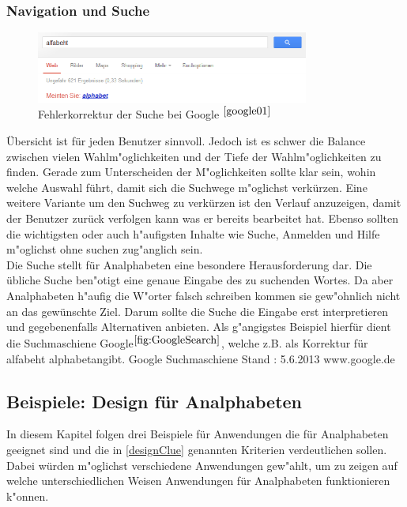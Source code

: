 \subsubsection{Navigation und Suche}
\begin{figure}[h]
	\centering
		\includegraphics[width=0.80\textwidth]{Daten/rechtschreibung.png}
	\caption{Fehlerkorrektur der Suche bei Google $^{\ref{google01}}$}
	\label{fig:GoogleSearch}
\end{figure}

Übersicht ist für jeden Benutzer sinnvoll. Jedoch ist es schwer die Balance zwischen vielen Wahlm"oglichkeiten und der Tiefe der Wahlm"oglichkeiten zu finden. Gerade zum Unterscheiden der M"oglichkeiten sollte klar sein, wohin welche Auswahl führt, damit sich die 
Suchwege m"oglichst verkürzen. Eine weitere Variante um den Suchweg zu verkürzen ist den Verlauf anzuzeigen, damit der Benutzer zurück verfolgen kann was er bereits bearbeitet hat. Ebenso sollten die wichtigsten oder auch h"aufigsten Inhalte wie Suche, Anmelden und Hilfe m"oglichst ohne suchen zug"anglich sein.\\
Die Suche stellt für Analphabeten eine besondere Herausforderung dar. Die übliche Suche ben"otigt eine genaue Eingabe des zu suchenden Wortes. Da aber Analphabeten h"aufig die W"orter falsch schreiben kommen sie gew"ohnlich nicht an das gewünschte Ziel. Darum sollte die Suche die Eingabe erst interpretieren und gegebenenfalls Alternativen anbieten.
Als g"angigstes Beispiel hierfür dient die Suchmaschiene Google$^{\ref{fig:GoogleSearch}}$, welche z.B. als Korrektur für \glqq alfabeht \grqq \glqq alphabet\grqq angibt.
						{Google Suchmaschiene}
						{Stand : 5.6.2013}
						{www.google.de}

\subsection{Beispiele: Design für Analphabeten}
In diesem Kapitel folgen drei Beispiele für Anwendungen die für Analphabeten geeignet sind und die in \ref{designClue} genannten Kriterien verdeutlichen sollen. Dabei würden m"oglichst verschiedene Anwendungen gew"ahlt, um zu zeigen auf welche unterschiedlichen Weisen Anwendungen für Analphabeten funktionieren k"onnen.

